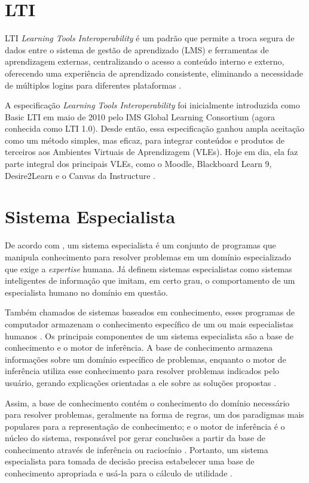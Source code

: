 \section{LTI}

LTI \textit{Learning Tools Interoperability} é um padrão que permite a troca segura de dados entre o sistema de gestão de aprendizado (LMS) e ferramentas de aprendizagem externas, centralizando o acesso a conteúdo interno e externo, oferecendo uma experiência de aprendizado consistente, eliminando a necessidade de múltiplos logins para diferentes plataformas \cite{verdaguer}.

A especificação \textit{Learning Tools Interoperability} foi inicialmente introduzida como Basic LTI em maio de 2010 pelo IMS Global Learning Consortium (agora conhecida como LTI 1.0). Desde então, essa especificação ganhou ampla aceitação como um método simples, mas eficaz, para integrar conteúdos e produtos de terceiros aos Ambientes Virtuais de Aprendizagem (VLEs). Hoje em dia, ela faz parte integral dos principais VLEs, como o Moodle, Blackboard Learn 9, Desire2Learn e o Canvas da Instructure \cite[p.4]{vickers}.

\section{Sistema Especialista}

De acordo com \textcite{jimmysingla}, um sistema especialista é um conjunto de programas que manipula conhecimento para resolver problemas em um domínio especializado que exige a \textit{expertise} humana. Já \textcite{markobohanec} definem sistemas especialistas como sistemas inteligentes de informação que imitam, em certo grau, o comportamento de um especialista humano no domínio em questão.

Também chamados de sistemas baseados em conhecimento, esses programas de computador armazenam o conhecimento específico de um ou mais especialistas humanos \cite{jimmysingla}. Os principais componentes de um sistema especialista são a base de conhecimento e o motor de inferência. A base de conhecimento armazena informações sobre um domínio específico de problemas, enquanto o motor de inferência utiliza esse conhecimento para resolver problemas indicados pelo usuário, gerando explicações orientadas a ele sobre as soluções propostas \cite{markobohanec}. 

Assim, a base de conhecimento contém o conhecimento do domínio necessário para resolver problemas, geralmente na forma de regras, um dos paradigmas mais populares para a representação de conhecimento; e o motor de inferência é o núcleo do sistema, responsável por gerar conclusões a partir da base de conhecimento através de inferência ou raciocínio \cite{jimmysingla}. Portanto, um sistema especialista para tomada de decisão precisa estabelecer uma base de conhecimento apropriada e usá-la para o cálculo de utilidade \cite{markobohanec}.


